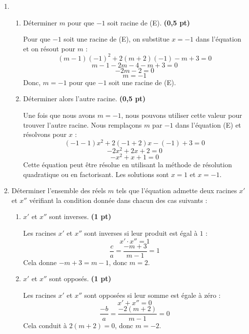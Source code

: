 \documentclass[12pt]{article}
\begin{document}
\begin{enumerate}
    \item 
    \begin{enumerate}
        \item Déterminer $m$ pour que $-1$ soit racine de (E). \textbf{(0,5 pt)}
        
        Pour que $-1$ soit une racine de (E), on substitue $x = -1$ dans l'équation et on résout pour $m$ :
        \[
        (m -1)(-1)^2 + 2(m + 2)(-1) - m + 3 = 0
        \]
        \[
        m - 1 - 2m - 4 - m + 3 = 0
        \]
        \[
        -2m - 2 = 0
        \]
        \[
        m = -1
        \]
        Donc, $m = -1$ pour que $-1$ soit une racine de (E).
        
        \item Déterminer alors l’autre racine. \textbf{(0,5 pt)}
        
        Une fois que nous avons $m = -1$, nous pouvons utiliser cette valeur pour trouver l'autre racine. Nous remplaçons $m$ par $-1$ dans l'équation (E) et résolvons pour $x$ :
        \[
        (-1 - 1)x^2 + 2(-1 + 2)x - (-1) + 3 = 0
        \]
        \[
        -2x^2 + 2x + 2 = 0
        \]
        \[
        -x^2 + x + 1 = 0
        \]
        Cette équation peut être résolue en utilisant la méthode de résolution quadratique ou en factorisant. Les solutions sont $x = 1$ et $x = -1$.
    \end{enumerate}

    \item Déterminer l’ensemble des réels $m$ tels que l’équation admette deux racines $x'$ et $x''$ vérifiant la condition donnée dans chacun des cas suivants :
    \begin{enumerate}
        \item $x'$ et $x''$ sont inverses. \textbf{(1 pt)}
        
        Les racines $x'$ et $x''$ sont inverses si leur produit est égal à $1$ :
        \[
        x' \cdot x'' = 1
        \]
        \[
        \frac{c}{a} = \frac{-m + 3}{m - 1} = 1
        \]
        Cela donne $-m + 3 = m - 1$, donc $m = 2$.
        
        \item $x'$ et $x''$ sont opposés. \textbf{(1 pt)}
        
        Les racines $x'$ et $x''$ sont opposées si leur somme est égale à zéro :
        \[
        x' + x'' = 0
        \]
        \[
        \frac{-b}{a} = \frac{-2(m + 2)}{m - 1} = 0
        \]
        Cela conduit à $2(m + 2) = 0$, donc $m = -2$.
        

\end{enumerate}
\end{enumerate}
\end{document}

